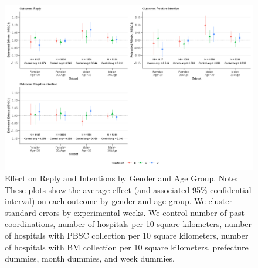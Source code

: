 \documentclass[
  a4paperpaper,
]{article}
\begin{document}
\begin{figure}

{\centering \includegraphics{body_files/figure-pdf/reg-reply-stock-subsample-output-1.png}

}

\caption{Effect on Reply and Intentions by Gender and Age Group. Note:
These plots show the average effect (and associated 95\% confidential
interval) on each outcome by gender and age group. We cluster standard
errors by experimental weeks. We control number of past coordinations,
number of hospitals per 10 square kilometers, number of hospitals with
PBSC collection per 10 square kilometers, number of hospitals with BM
collection per 10 square kilometers, prefecture dummies, month dummies,
and week dummies.}

\end{figure}
\end{document}
